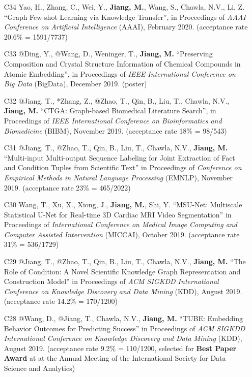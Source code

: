 \documentclass[10pt]{article}
\newenvironment{myindentpar}[1]%
{\begin{list}{}%
         {\setlength{\leftmargin}{#1}}%
         \item[]%
}
{\end{list}}
\newcounter{list}
\begin{document}
\begin{myindentpar}{0.00cm}
\begin{enumerate}[leftmargin=.5cm]
\item[C34] Yao, H., Zhang, C., Wei, Y., \textbf{Jiang, M.}, Wang, S., Chawla, N.V., Li, Z. ``Graph Few-shot Learning via Knowledge Transfer'', in Proceedings of \textit{AAAI Conference on Artificial Intelligence} (AAAI), February 2020. (acceptance rate 20.6\% = 1591/7737)

\item[C33] @Ding, Y., @Wang, D., Weninger, T., \textbf{Jiang, M.} ``Preserving Composition and Crystal Structure Information of Chemical Compounds in Atomic Embedding'', in Proceedings of \textit{IEEE International Conference on Big Data} (BigData), December 2019. (poster)

\item[C32] @Jiang, T., *Zhang, Z., @Zhao, T., Qin, B., Liu, T., Chawla, N.V., \textbf{Jiang, M.} ``CTGA: Graph-based Biomedical Literature Search'', in Proceedings of \textit{IEEE International Conference on Bioinformatics and Biomedicine} (BIBM), November 2019. (acceptance rate 18\% = 98/543)

\item[C31] @Jiang, T., @Zhao, T., Qin, B., Liu, T., Chawla, N.V., \textbf{Jiang, M.} ``Multi-input Multi-output Sequence Labeling for Joint Extraction of Fact and Condition Tuples from Scientific Text'' in Proceedings of \textit{Conference on Empirical Methods in Natural Language Processing} (EMNLP), November 2019. (acceptance rate 23\% = 465/2022)

\item[C30] Wang, T., Xu, X., Xiong, J., \textbf{Jiang, M.}, Shi, Y. ``MSU-Net: Multiscale Statistical U-Net for Real-time 3D Cardiac MRI Video Segmentation'' in Proceedings of \textit{International Conference on Medical Image Computing and Computer Assisted Intervention} (MICCAI), October 2019. (acceptance rate 31\% = 536/1729)

\item[C29] @Jiang, T., @Zhao, T., Qin, B., Liu, T., Chawla, N.V., \textbf{Jiang, M.} ``The Role of Condition: A Novel Scientific Knowledge Graph Representation and Construction Model'' in Proceedings of \textit{ACM SIGKDD International Conference on Knowledge Discovery and Data Mining} (KDD), August 2019. (acceptance rate 14.2\% = 170/1200)

\item[C28] @Wang, D., @Jiang, T., Chawla, N.V., \textbf{Jiang, M.} ``TUBE: Embedding Behavior Outcomes for Predicting Success'' in Proceedings of \textit{ACM SIGKDD International Conference on Knowledge Discovery and Data Mining} (KDD), August 2019. (acceptance rate 9.2\% = 110/1200, selected for \textbf{Best Paper Award} at at the Annual Meeting of the International Society for Data Science and Analytics)
	

\end{enumerate}
\end{myindentpar}
\end{document}
